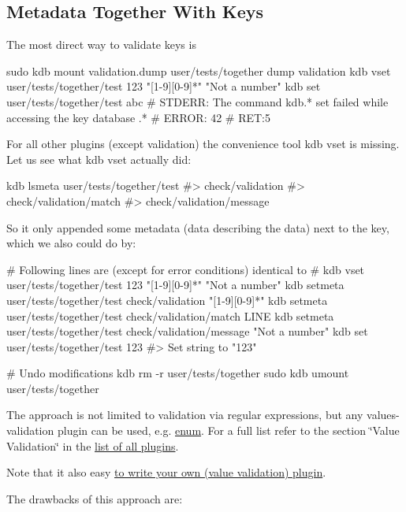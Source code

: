 \subsection*{Metadata Together With Keys}

The most direct way to validate keys is


\begin{DoxyCode}
sudo kdb mount validation.dump user/tests/together dump validation
kdb vset user/tests/together/test 123 "[1-9][0-9]*" "Not a number"
kdb set user/tests/together/test abc
# STDERR: The command kdb.* set failed while accessing the key database .*
# ERROR:  42
# RET:5
\end{DoxyCode}


For all other plugins (except {\ttfamily validation}) the convenience tool {\ttfamily kdb vset} is missing. Let us see what {\ttfamily kdb vset} actually did\+:


\begin{DoxyCode}
kdb lsmeta user/tests/together/test
#> check/validation
#> check/validation/match
#> check/validation/message
\end{DoxyCode}


So it only appended some metadata (data describing the data) next to the key, which we also could do by\+:


\begin{DoxyCode}
# Following lines are (except for error conditions) identical to
# kdb vset user/tests/together/test 123 "[1-9][0-9]*" "Not a number"
kdb setmeta user/tests/together/test check/validation "[1-9][0-9]*"
kdb setmeta user/tests/together/test check/validation/match LINE
kdb setmeta user/tests/together/test check/validation/message "Not a number"
kdb set user/tests/together/test 123
#> Set string to "123"

# Undo modifications
kdb rm -r user/tests/together
sudo kdb umount user/tests/together
\end{DoxyCode}


The approach is not limited to validation via regular expressions, but any values-\/validation plugin can be used, e.\+g. \hyperlink{md_src_plugins_enum_README_src_plugins_enum_README_md}{enum}. For a full list refer to the section \char`\"{}\+Value Validation\char`\"{} in the \hyperlink{src_plugins_README_md}{list of all plugins}.

Note that it also easy \hyperlink{doc_tutorials_plugins_md}{to write your own (value validation) plugin}.

The drawbacks of this approach are\+:


